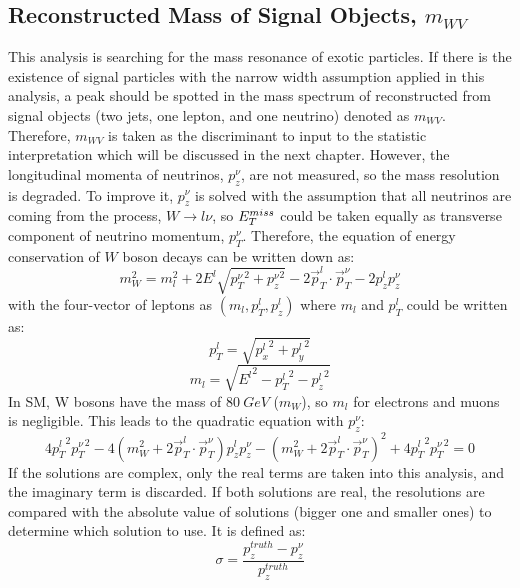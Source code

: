 \subsection{Reconstructed Mass of Signal Objects, $m_{WV}$}
\label{Subsec:mwv}
This analysis is searching for the mass resonance of exotic particles. If there is the existence of signal particles with the narrow width assumption applied in this analysis, a peak should be spotted in the mass spectrum of reconstructed from signal objects (two jets, one lepton, and one neutrino) denoted as $m_{WV}$.  Therefore, $m_{WV}$ is taken as the discriminant to input to the statistic interpretation which will be discussed in the next chapter. However, the longitudinal momenta of neutrinos, $p_{z}^\nu$, are not measured, so the mass resolution is degraded. To improve it, $p_{z}^{\nu}$ is solved with the assumption that all neutrinos are coming from the process, $W\rightarrow l\nu$, so $E_{T}^{miss}$ could be taken equally as transverse component of neutrino momentum, $p_{T}^\nu$. Therefore, the equation of energy conservation of $W$ boson decays can be written down as:
\begin{equation}
m^2_W = m_{l}^{2} + 2E^{l}\sqrt{ {p_{T}^\nu}^2 + {p_{z}^\nu}^{2} }  - 2 \vec{p}_{T}^l \cdot \vec{p}_{T}^\nu - 2 {p_{z}^l}{p_{z}^\nu}
\end{equation}
with the four-vector of leptons as $(m_{l}, p_{T}^l, p_{z}^l)$ where $m_{l}$ and $p_{T}^l$ could be written as:
\begin{equation}
p_{T}^l=\sqrt{{p_{x}^l}^{2}+{p_{y}^l}^{2} }
\end{equation}
\noindent
\begin{equation}
m_{l} =\sqrt{{E^l}^2-{p^l_T}^2-{p^l_z}^2}
\end{equation}
In SM, W bosons have the mass of $80~GeV$ ($m_W$), so $m_{l}$ for electrons and muons is negligible. This leads to the quadratic equation with $p_{z}^\nu$:
\begin{equation}
4{p_T^l}^{2} {p_T^\nu}^{2} - 4 \left( m_{W}^{2} + 2 \vec{p}_{T}^l \cdot \vec{p}_{T}^\nu \right) p_{z}^l p_z^\nu - \left( m_{W}^{2} + 2\vec{p}_{T}^l \cdot \vec{p}_{T}^\nu  \right)^{2} +4{p_T^l}^{2} {p_{T}^\nu}^{2} = 0
\end{equation}
\noindent
If the solutions are complex, only the real terms are taken into this analysis, and the imaginary term is discarded. If both solutions are real, the resolutions are compared with the absolute value of solutions (bigger one and smaller ones) to determine which solution to use. It is defined as:
\begin{equation}
\sigma = \frac{p_z^{truth}-p_z^{\nu}}{p_z^{truth}}
\end{equation}
